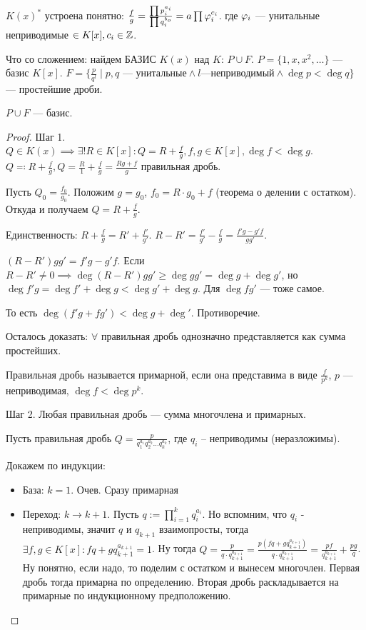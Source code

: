$K(x)^*$ устроена понятно:  $\frac{f}{g} = \frac{\prod p_i^{a_i}}{\prod q_i^{b_o}} = a \prod \varphi_i^{c_i}$. где $\varphi_i$ --- унитальные неприводимые  $\in K[x], c_i \in \mathbb{Z}$.

Что со сложением: найдем БАЗИС  $K(x)$ над  $K$:  $P \cup F$.  $P = \{1, x, x^2, \ldots\}$ --- базис $K[x]$.  $F = \{ \frac{p}{q^l} \mid p, q\text{ --- унитальные} \land l\text{---неприводимый} \land \deg p < \deg q\}$ --- простейшие дроби.

\begin{theorem}
    $P\cup F$ --- базис.
\end{theorem}
\begin{proof}
    Шаг 1. $Q \in K(x) \implies \exists! R \in K[x]\!: Q = R + \frac{f}{g}, f, g \in K[x], \deg f < \deg g$. $Q \eqqcolon R + \frac{f}{g},Q = \frac{R}{1} + \frac{f}{g} = \frac{Rg+f}{g}$ правильная дробь.

    Пусть $Q_0 = \frac{f_0}{g_0}$. Положим $g = g_0$, $f_0 = R \cdot g_0 +f$ (теорема о делении с остатком). Откуда и получаем $Q = R + \frac{f}{g}$. 

    Единственность: $R + \frac{f}{g} = R' + \frac{f'}{g'}$. $R - R' = \frac{f'}{g'} - \frac{f}{g} = \frac{f'g - g'f}{gg'}$.

    $(R-R')gg' = f'g - g'f$. Если  $R - R' \neq 0 \implies \deg (R-R')gg' \ge \deg gg' = \deg g + \deg g'$, но $\deg f'g = \deg f' + \deg g < \deg g' + \deg g$. Для  $\deg fg'$ --- тоже самое.

    То есть  $\deg (f'g + fg') < \deg g + \deg'$. Противоречие.

    Осталось доказать:  $\forall$ правильная дробь однозначно представляется как сумма простейших. 
     \begin{definition}
        Правильная дробь называется примарной, если она представима в виде $\frac{f}{p^k}$, $p$ --- неприводимая,  $\deg f < \deg p^k$.
    \end{definition}
    
    Шаг 2. Любая правильная дробь --- сумма многочлена и примарных.
    
    Пусть правильная дробь $Q=\frac{p}{q_1^{a_1}q_2^{a_2}\ldots q_k^{a_k}}$, где $q_i$ -- неприводимы (неразложимы).
    
    Докажем по индукции:
    \begin{itemize}
         \item База: $k=1$. Очев. Сразу примарная
         \item Переход: $k \to k + 1$. Пусть $q := \prod\limits_{i=1}^{k}q_i^{a_i}$. Но вспомним, что $q_i$ - неприводимы, значит $q$ и $q_{k + 1}$ взаимопросты, тогда $\exists f, g \in K[x] : fq + gq_{k+1}^{a_{k+1}} = 1$. Ну тогда $Q = \frac{p}{q\cdot q_{k + 1}^{a_{k + 1}}} = \frac{p\left(fq + gq_{k+1}^{a_{k+1}}\right)}{q\cdot q_{k + 1}^{a_{k + 1}}} = \frac{pf}{q_{k + 1}^{a_{k + 1}}} + \frac{pg}{q}$. Ну понятно, если надо, то поделим с остатком и вынесем многочлен. Первая дробь тогда примарна по определению. Вторая дробь раскладывается на примарные по индукционному предположению.
    \end{itemize}


\end{proof}
